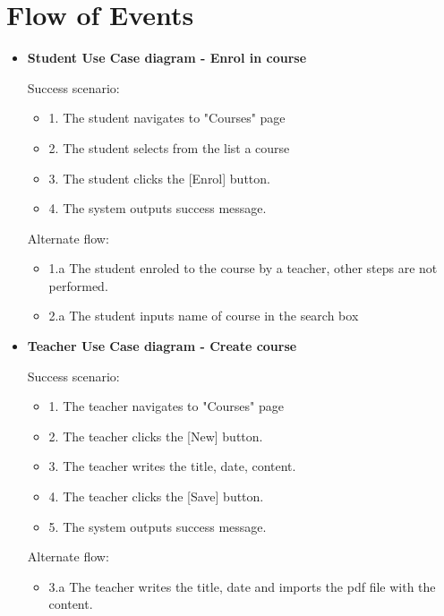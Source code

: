 \documentclass[12pt,a4paper,titlepage]{article}
\begin{document}
\section{Flow of Events}
\begin{itemize}
\item
\noindent\textbf{Student Use Case diagram - Enrol in course}
\begin{description}
    \item[Success scenario:]
\end{description}
\renewcommand{\labelenumii}{\arabic{enumii}}
\begin{itemize}
  \item 1. The student navigates to "Courses" page
  \item 2. The student selects from the list a course
  \item 3. The student clicks the [Enrol] button.
  \item 4. The system outputs success message.
\end{itemize}
\begin{description}
    \item[Alternate flow:]
\end{description}
\begin{itemize}
  \item 1.a The student enroled to the course by a teacher, other steps are not performed.
  \item 2.a The student inputs name of course in the search box
\end{itemize}

\item
\noindent\textbf{Teacher Use Case diagram - Create course}
\begin{description}
    \item[Success scenario:]
\end{description}
\renewcommand{\labelenumii}{\arabic{enumii}}
\begin{itemize}
  \item 1. The teacher navigates to "Courses" page
  \item 2. The teacher clicks the [New] button.
  \item 3. The teacher writes the title, date, content.
  \item 4. The teacher clicks the [Save] button.
  \item 5. The system outputs success message.
\end{itemize}
\begin{description}
    \item[Alternate flow:]
\end{description}
\begin{itemize}
  \item 3.a The teacher writes the title, date and imports the pdf file with the content.
\end{itemize}


\end{itemize}
\end{document}
